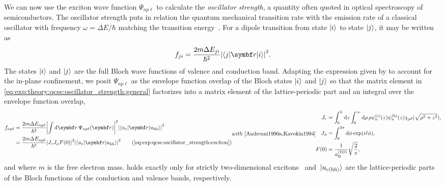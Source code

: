 We can now use the exciton wave function $\Psi_{np\ell}$ to calculate the \emph{oscillator strength}, a quantity often quoted in optical spectroscopy of semiconductors.
The oscillator strength puts in relation the quantum mechanical transition rate with the emission rate of a classical oscillator with frequency $\omega = \Delta E/\hbar$ matching the transition energy~\cite{Hilborn1982}.
For a dipole transition from state $\ket{i}$ to state $\ket{j}$, it may be written as~\cite{Davies2009}
\begin{equation}\label{eq:exp:theory:qcse:oscillator_strength:general}
    f_{ji} = \frac{2m\Delta E_{ji}}{\hbar^2} \abs{\!\matrixelement{j}{\bvec{r}}{i}}^2.
\end{equation}
The states $\ket{i}$ and $\ket{j}$ are the full Bloch wave functions of valence and conduction band.
Adapting the expression given by \textcite{Andreani1990a} to account for the in-plane confinement, we posit $\Psi_{np\ell}$ as the envelope function overlap of the Bloch states $\ket{i}$ and $\ket{j}$ so that the matrix element in \cref{eq:exp:theory:qcse:oscillator_strength:general} factorizes into a matrix element of the lattice-periodic part and an integral over the envelope function overlap,
\begin{subequations}\label{eq:exp:qcse:oscillator_strength:exciton}
\begin{align}
    f_{np\ell} &= \frac{2m\Delta E_{np\ell}}{\hbar^2} \abs{\int\dd{\bvec{r}}\Psi_{np\ell}(\bvec{r})}^2\abs{\!\mel*{u_{\mr{c}}}{\bvec{r}}{u_{\mr{hh}}}}^2\notag \\
               &= \frac{2m\Delta E_{np\ell}}{\hbar^2} \abs{J_r J_{\phi} F(0)}^2 \abs{\!\mel*{u_{\mr{c}}}{\bvec{r}}{u_{\mr{hh}}}}^2\tag{\ref{eq:exp:qcse:oscillator_strength:exciton}}
\end{align}
with~\cite{Andreani1990a,Kavokin1994}
\begin{align}
    J_{r} &= \int_{0}^{L}\dd{z}\int_0^{\infty}\dd{\rho}\rho\psi_n\gth{\mr{e}}(z)\psi_n\gth{\mr{h}}(z)\chi_{p\ell}(\sqrt{\rho^2 + z^2}), \label{eq:exp:theory:osc:rz} \\
    J_{\phi} &= \int_0^{2\pi}\dd{\phi}\exp(\i\ell\phi), \label{eq:exp:theory:osc:phi} \\
    F(0) &= \frac{1}{a_{\mr{B}}\gth{2D}}\sqrt{\frac{2}{\pi}}, \label{eq:exp:theory:osc:relative}
\end{align}
\end{subequations}
and where $m$ is the free electron mass.
 holds exactly only for strictly two-dimensional excitons~\cite{Andreani1990a} and $\ket*{u_{\mathrm{c}(\mathrm{hh})}}$ are the lattice-periodic parts of the Bloch functions of the conduction and valence bands, respectively.
